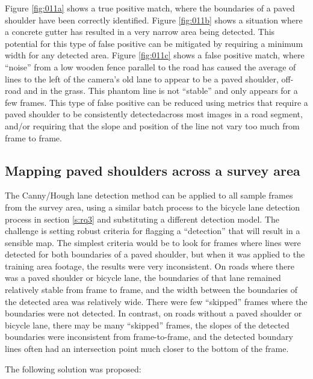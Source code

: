 \documentclass[11pt,twoside]{report}
\begin{document}
Figure \ref{fig:011a} shows a true positive match, where the boundaries of a paved shoulder have been correctly identified.  Figure \ref{fig:011b} shows a situation where a concrete gutter has resulted in a very narrow area being detected.  This potential for this type of false positive can be mitigated by requiring a minimum width for any detected area.  Figure \ref{fig:011c} shows a false positive match, where ``noise'' from a low wooden fence parallel to the road has caused the average of lines to the left of the camera's old lane to appear to be a paved shoulder, off-road and in the grass.  This phantom line is not ``stable'' and only appears for a few frames.  This type of false positive can be reduced using metrics that require a paved shoulder to be consistently detectedacross most images in a road segment, and/or requiring that the slope and position of the line not vary too much from frame to frame.


\subsection{Mapping paved shoulders across a survey area}
\label{s:rq4c}

The Canny/Hough lane detection method can be applied to all sample frames from the survey area, using a similar batch process to the bicycle lane detection process in section \ref{s:rq3} and substituting a different detection model.  The challenge is setting robust criteria for flagging a ``detection'' that will result in a sensible map.  The simplest criteria would be to look for frames where lines were detected for both boundaries of a paved shoulder, but when it was applied to the training area footage, the results were very inconsistent.  On roads where there was a paved shoulder or bicycle lane, the boundaries of that lane remained relatively stable from frame to frame, and the width between the boundaries of the detected area was relatively wide.  There were few ``skipped'' frames where the boundaries were not detected.  In contrast, on roads without a paved shoulder or bicycle lane, there may be many ``skipped'' frames, the slopes of the detected boundaries were inconsistent from frame-to-frame, and the detected boundary lines often had an intersection point much closer to the bottom of the frame.

The following solution was proposed:
\end{document}
